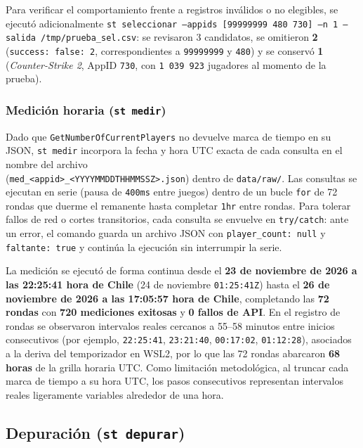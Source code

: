 \documentclass[11pt,a4paper]{article}
\begin{document}
Para verificar el comportamiento frente a registros inválidos o no elegibles, se ejecutó adicionalmente \texttt{st seleccionar --appids [99999999 480 730] --n 1 --salida /tmp/prueba\_sel.csv}: se revisaron 3 candidatos, se omitieron \textbf{2} (\texttt{success: false: 2}, correspondientes a \texttt{99999999} y \texttt{480}) y se conservó \textbf{1} (\emph{Counter-Strike 2}, AppID \texttt{730}, con \texttt{1\,039\,923} jugadores al momento de la prueba).

\subsubsection{Medición horaria (\texttt{st medir})}
Dado que \texttt{GetNumberOfCurrentPlayers} no devuelve marca de tiempo en su JSON, \texttt{st medir} incorpora la fecha y hora UTC exacta de cada consulta en el nombre del archivo \\(\texttt{med\_<appid>\_<YYYYMMDDTHHMMSSZ>.json}) dentro de \texttt{data/raw/}. Las consultas se ejecutan en serie (pausa de \texttt{400ms} entre juegos) dentro de un bucle \texttt{for} de 72 rondas que duerme el remanente hasta completar \texttt{1hr} entre rondas. Para tolerar fallos de red o cortes transitorios, cada consulta se envuelve en \texttt{try/catch}: ante un error, el comando guarda un archivo JSON con \texttt{player\_count: null} y \texttt{faltante: true} y continúa la ejecución sin interrumpir la serie.

La medición se ejecutó de forma continua desde el \textbf{23 de noviembre de 2026 a las 22:25:41 hora de Chile} (24 de noviembre \texttt{01:25:41Z}) hasta el \textbf{26 de noviembre de 2026 a las 17:05:57 hora de Chile}, completando las \textbf{72 rondas} con \textbf{720 mediciones exitosas} y \textbf{0 fallos de API}. En el registro de rondas se observaron intervalos reales cercanos a 55--58 minutos entre inicios consecutivos (por ejemplo, \texttt{22:25:41}, \texttt{23:21:40}, \texttt{00:17:02}, \texttt{01:12:28}), asociados a la deriva del temporizador en WSL2, por lo que las 72 rondas abarcaron \textbf{68 horas} de la grilla horaria UTC. Como limitación metodológica, al truncar cada marca de tiempo a su hora UTC, los pasos consecutivos representan intervalos reales ligeramente variables alrededor de una hora.

\subsection{Depuración (\texttt{st depurar})}
\end{document}
